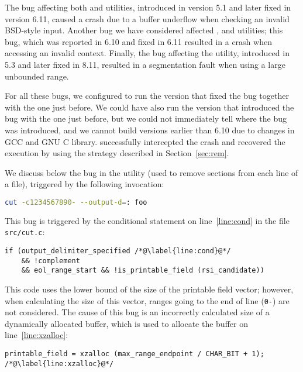The bug affecting both \mdsum and \shasum utilities, introduced in version 5.1
and later fixed in version 6.11, caused a crash due to a buffer underflow when
checking an invalid BSD-style input. Another bug we have considered affected
\mkdir, \mkfifo and \mknod utilities; this bug, which was reported in 6.10 and
fixed in 6.11 resulted in a crash when accessing an invalid context.  Finally,
the bug affecting the \cut utility, introduced in 5.3 and later fixed in 8.11,
resulted in a segmentation fault when using a large unbounded range. 

For all these bugs, we configured \mx to run the version that fixed the
bug together with the one just before. We could have also run the
version that introduced the bug with the one just before, but we could
not immediately tell where the bug was introduced, and we cannot build
versions earlier than 6.10 due to changes in GCC and GNU C library. \mx
successfully intercepted the crash and recovered the execution by using
the strategy described in Section~\ref{sec:rem}.

We discuss below the bug in the \cut utility (used to remove sections
from each line of a file), triggered by the following invocation:

\begin{lstlisting}[numbers=none,breaklines=true,xleftmargin=0pt,language=bash]
cut -c1234567890- --output-d=: foo
\end{lstlisting}

This bug is triggered by the conditional statement on line~\ref{line:cond} in
the file \texttt{src/cut.c}:

\begin{lstlisting}[firstnumber=516]
if (output_delimiter_specified /*@\label{line:cond}@*/
    && !complement
    && eol_range_start && !is_printable_field (rsi_candidate))
\end{lstlisting}

This code uses the lower bound of the size of the printable field vector;
however, when calculating the size of this vector, ranges going to the end of
line (\ie \lstinline`0-`) are not considered. The cause of this bug is an
incorrectly calculated size of a dynamically allocated buffer, which is used to
allocate the buffer on line~\ref{line:xzalloc}:

\begin{lstlisting}[firstnumber=495]
printable_field = xzalloc (max_range_endpoint / CHAR_BIT + 1); /*@\label{line:xzalloc}@*/
\end{lstlisting}

